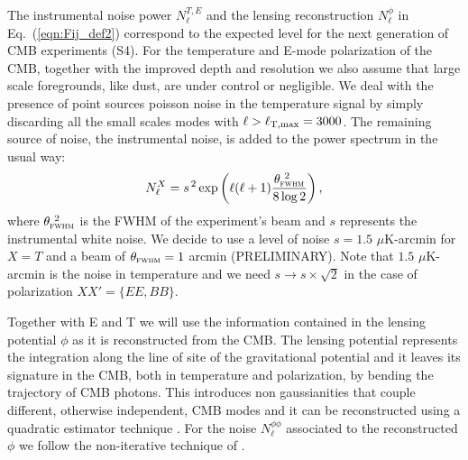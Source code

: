 \documentclass[aps,prd,reprint,superscriptaddress]{revtex4-1}
\newcommand\refeq[1]{Eq.~(\ref{eqn:#1})}
\begin{document}
The instrumental noise power $N_{\ell}^{T,E}$ and the lensing reconstruction $N_{\ell}^{\phi}$ in \refeq{Fij_def2} correspond to the expected level for the next generation of CMB experiments (S4).
For the temperature and E-mode polarization of the CMB, together with the improved depth and resolution we also assume that large scale foregrounds, like dust, are under control or negligible. We deal with the presence of point sources poisson noise in the temperature signal by simply discarding all the small scales modes with $\ell>\ell_{\rm T,max}=3000$.
The remaining source of noise, the instrumental noise, is added to the power spectrum in the usual way:
 \begin{equation}
 	\centering
		N^{X}_\ell = s^{\, 2} \exp \left(\ell(\ell+1) \frac{\theta^{\ 2}_{\textsc{fwhm}}}{8\log2}\right),
	\label{eq:beamnoise}
\end{equation}
where $\theta^{\ 2}_{\textsc{fwhm}}$ is the FWHM of the experiment's beam and $s$ represents the instrumental white noise.
We decide to use a level of noise $s = 1.5$ $\mu$K-arcmin for $X=T$ and a beam of $\theta_{\textsc{fwhm}}=1$ arcmin (PRELIMINARY).
Note that $1.5$ $\mu$K-arcmin is the noise in temperature and we need $s \rightarrow s\times \sqrt{2}$ in the case of polarization $ XX' = \{ EE, BB \}$.


Together with E and T we will use the information contained in the lensing potential $\phi$ as it is reconstructed from the CMB. The lensing potential represents the integration along the line of site of the gravitational potential and it leaves its signature in the CMB, both in temperature and polarization, by bending the trajectory of CMB photons. This introduces non gaussianities that couple different, otherwise independent, CMB modes and it can be reconstructed using a quadratic estimator technique \cite{okamoto:2003,hu:2002}.
For the noise $N_\ell^{\phi\phi}$ associated to the reconstructed $\phi$ we follow the non-iterative technique of \cite{okamoto:2003,hu:2002}.




%



\end{document}
